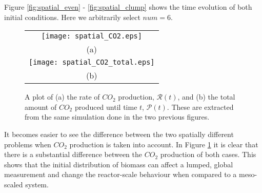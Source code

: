 Figure \ref{fig:spatial_even} - \ref{fig:spatial_clump} shows the time evolution of both initial conditions.
Here we arbitrarily select $num = 6$.

\begin{figure}
  \centering
  \begin{tabular}{c}
    \texttt{[image: spatial\_CO2.eps]} \\
    (a) \\
    \texttt{[image: spatial\_CO2\_total.eps]} \\
    (b)
  \end{tabular}
  \caption{A plot of (a) the rate of $CO_2$ production, $\mathcal{R}(t)$, and (b) the total amount of $CO_2$ produced until time $t$, $\mathcal{P}(t)$.
    These are extracted from the same simulation done in the two previous figures.
  }
  \label{fig:spatial_CO2}
\end{figure}

It becomes easier to see the difference between the two spatially different problems when $CO_2$ production is taken into account.
In Figure \ref{fig:spatial_CO2} it is clear that there is a substantial difference between the $CO_2$ production of both cases.
This shows that the initial distribution of biomass can affect a lumped, global measurement and change the reactor-scale behaviour when compared to a meso-scaled system.



